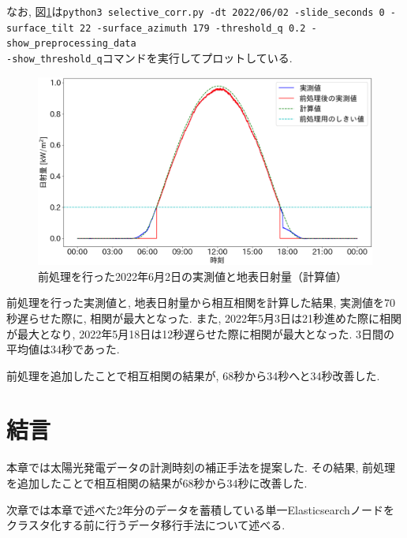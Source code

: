 なお, 図\ref{2-p2}は\texttt{python3 selective_corr.py -dt 2022/06/02 -slide_seconds 0 -surface_tilt 22 -surface_azimuth 179 -threshold_q 0.2 -show_preprocessing_data \\ -show_threshold_q}コマンドを実行してプロットしている.

\begin{figure}[H]
  \begin{center}
    \includegraphics[width=140mm]{sotu/figure/2/drop-under-0.2-q.png}
    \caption{前処理を行った2022年6月2日の実測値と地表日射量（計算値）}
    \label{2-p2}
  \end{center}
\end{figure}

前処理を行った実測値と, 地表日射量から相互相関を計算した結果, 実測値を70秒遅らせた際に, 相関が最大となった. また, 2022年5月3日は21秒進めた際に相関が最大となり, 2022年5月18日は12秒遅らせた際に相関が最大となった. 3日間の平均値は34秒であった.

前処理を追加したことで相互相関の結果が, 68秒から34秒へと34秒改善した.

\section{結言}
本章では太陽光発電データの計測時刻の補正手法を提案した. その結果, 前処理を追加したことで相互相関の結果が68秒から34秒に改善した.

次章では本章で述べた2年分のデータを蓄積している単一Elasticsearchノードをクラスタ化する前に行うデータ移行手法について述べる.
